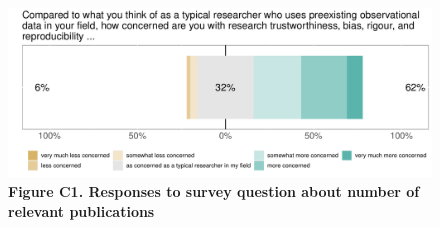 \documentclass[
  man,floatsintext]{apa6}
\begin{document}
\begin{table}[H]

\caption{\label{tab:languageTable}\textbf{Table C1. ``What programming language or software do you use for your analyses of preexisting observational data? (you may select multiple answers)''}}
\end{table}

{\smaller[1]
\begin{singlespace}



\end{singlespace}
}

\begin{figure}

{\centering \includegraphics[width=1\linewidth]{figs/concernedPlot-1} 

}

\caption{\textbf{Figure C1. Responses to survey question about number of relevant publications}}\label{fig:concernedPlot}
\end{figure}
\end{document}
